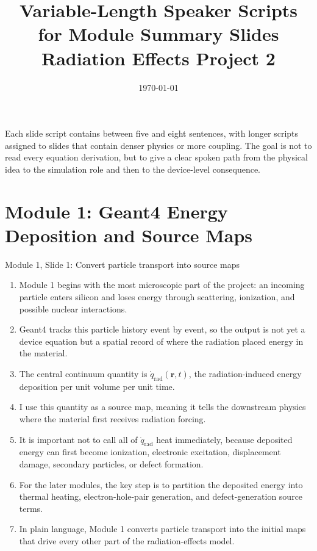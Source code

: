 \documentclass[11pt]{article}
\title{Variable-Length Speaker Scripts for Module Summary Slides\\\large Radiation Effects Project 2}
\author{}
\date{\today}
\newcommand{\qrad}{\dot{q}_{\mathrm{rad}}}
\begin{document}
\maketitle

\begin{tcolorbox}[colback=softgreen,colframe=darkgreen,title=How to use this document]
Each slide script contains between five and eight sentences, with longer scripts assigned to slides that contain denser physics or more coupling.  The goal is not to read every equation derivation, but to give a clear spoken path from the physical idea to the simulation role and then to the device-level consequence.
\end{tcolorbox}

\tableofcontents
\newpage

\section{Module 1: Geant4 Energy Deposition and Source Maps}

\begin{slidebox}{Module 1, Slide 1: Convert particle transport into source maps}
\begin{enumerate}
\item Module 1 begins with the most microscopic part of the project: an incoming particle enters silicon and loses energy through scattering, ionization, and possible nuclear interactions.
\item Geant4 tracks this particle history event by event, so the output is not yet a device equation but a spatial record of where the radiation placed energy in the material.
\item The central continuum quantity is \(\qrad(\bm r,t)\), the radiation-induced energy deposition per unit volume per unit time.
\item I use this quantity as a source map, meaning it tells the downstream physics where the material first receives radiation forcing.
\item It is important not to call all of \(\qrad\) heat immediately, because deposited energy can first become ionization, electronic excitation, displacement damage, secondary particles, or defect formation.
\item For the later modules, the key step is to partition the deposited energy into thermal heating, electron-hole-pair generation, and defect-generation source terms.
\item In plain language, Module 1 converts particle transport into the initial maps that drive every other part of the radiation-effects model.
\end{enumerate}
\end{slidebox}
\end{document}
